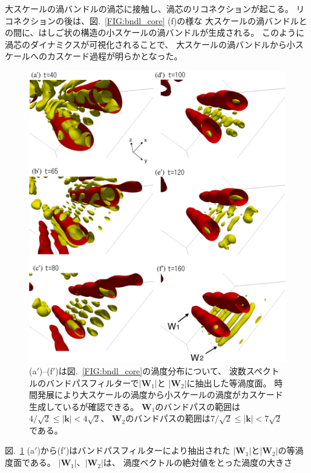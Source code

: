 \documentclass[12pt,a4paper]{jbook}
\begin{document}
			大スケールの渦バンドルの渦芯に接触し、渦芯のリコネクションが起こる。
			リコネクションの後は、図.~\ref{FIG:bndl_core} (f)の様な
			大スケールの渦バンドルとの間に、はしご状の構造の小スケールの渦バンドルが生成される。
			このように渦芯のダイナミクスが可視化されることで、
            大スケールの渦バンドルから小スケールへのカスケード過程が明らかとなった。
			\begin{figure}[H]
				\centering
				\includegraphics[width=15cm]{bundle_vor.eps}
				\caption{
					(a$'$)--(f$'$)は図.~\ref{FIG:bndl_core}の渦度分布について、
                    波数スペクトルのバンドパスフィルターで$|\bm{W}_1|$と
					$|\bm{W}_2|$に抽出した等渦度面。
                    時間発展により大スケールの渦度から小スケールの渦度がカスケード生成しているが確認できる。
                    $\bm{W}_1$のバンドパスの範囲は$4/\sqrt{2}\leq |\bm{k}| < 4\sqrt{2}$、
                    $\bm{W}_2$のバンドパスの範囲は$7/\sqrt{2}\leq |\bm{k}| < 7\sqrt{2}$である。 
				}
				\label{FIG:bndl_vor}
			\end{figure}
			図.~\ref{FIG:bndl_vor} (a$'$)から(f$'$)はバンドパスフィルターにより抽出された
			$|\bm{W}_1|$と$|\bm{W}_2|$の等渦度面である。
            $|\bm{W}_1|$、$|\bm{W}_2|$は、
            渦度ベクトルの絶対値をとった渦度の大きさ
\end{document}
